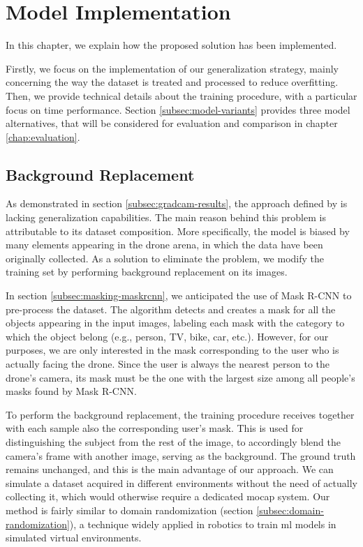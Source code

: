 \chapter{Model Implementation}
\label{chap:implementation}

In this chapter, we explain how the proposed solution has been implemented.

Firstly, we focus on the implementation of our generalization strategy, mainly concerning the way the dataset is treated and processed to reduce overfitting. Then, we provide technical details about the training procedure, with a particular focus on time performance. Section \ref{subsec:model-variants} provides three model alternatives, that will be considered for evaluation and comparison in chapter \ref{chap:evaluation}.




\section{Background Replacement}
\label{sec:implementation-bgreplace}

As demonstrated in section \ref{subsec:gradcam-results}, the approach defined by \cite{mantegazza2019visionbased} is lacking generalization capabilities. The main reason behind this problem is attributable to its dataset composition. More specifically, the model is biased by many elements appearing in the drone arena, in which the data have been originally collected. As a solution to eliminate the problem, we modify the training set by performing background replacement on its images.

In section \ref{subsec:masking-maskrcnn}, we anticipated the use of Mask R-CNN to pre-process the dataset. The algorithm detects and creates a mask for all the objects appearing in the input images, labeling each mask with the category to which the object belong (e.g., person, TV, bike, car, etc.). However, for our purposes, we are only interested in the mask corresponding to the user who is actually facing the drone. Since the user is always the nearest person to the drone's camera, its mask must be the one with the largest size among all people's masks found by Mask R-CNN.

To perform the background replacement, the training procedure receives together with each sample also the corresponding user's mask. This is used for distinguishing the subject from the rest of the image, to accordingly blend the camera's frame with another image, serving as the background. The ground truth remains unchanged, and this is the main advantage of our approach. We can simulate a dataset acquired in different environments without the need of actually collecting it, which would otherwise require a dedicated \gls{mocap} system. Our method is fairly similar to domain randomization (section \ref{subsec:domain-randomization}), a technique widely applied in robotics to train \gls{ml} models in simulated virtual environments.

